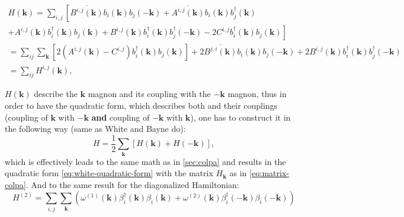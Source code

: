 \documentclass[a4paper,12pt]{article}
\begin{document}
            \begin{multline}
                H(\boldsymbol{k}) = \sum_{i,j}\left[\overline{B^{i,j}(\boldsymbol{k})}b_{i}(\boldsymbol{k})b_{j}(-\boldsymbol{k}) +
                \overline{A^{i,j}(\boldsymbol{k})}b_{i}(\boldsymbol{k})b^{\dag}_{j}(\boldsymbol{k})\right. \\+ 
                A^{i,j}(\boldsymbol{k})b^{\dag}_{i}(\boldsymbol{k})b_{j}(\boldsymbol{k}) +
                B^{i,j}(\boldsymbol{k})b^{\dag}_{i}(\boldsymbol{k})b^{\dag}_{j}(-\boldsymbol{k})-
                \left.2 C^{i,j}b^{\dag}_{i}(\boldsymbol{k})b_{j}(\boldsymbol{k})\right] \\
                = \sum_{ij}\sum_{\boldsymbol{k}}\left[2(A^{i,j}(\boldsymbol{k}) - C^{i,j})b^{\dag}_{i}(\boldsymbol{k})b_{j}(\boldsymbol{k})\right] 
                +2\overline{B^{j,i}(\boldsymbol{k})}b_i(\boldsymbol{k})b_{j}(-\boldsymbol{k}) 
                +2B^{i,j}(\boldsymbol{k})b^{\dag}_{i}(\boldsymbol{k})b^{\dag}_{j}(-\boldsymbol{k})\\
                = \sum_{ij} H^{i,j}(\boldsymbol{k}),
            \end{multline}

            $H(\boldsymbol{k})$ describe the $\boldsymbol{k}$ magnon and its coupling with the $-\boldsymbol{k}$ magnon, 
            thus in order to have the quadratic form, which describes both and their couplings 
            (coupling of $\boldsymbol{k}$ with $-\boldsymbol{k}$ \textbf{and} coupling of $-\boldsymbol{k}$ with $\boldsymbol{k}$), 
            one has to construct it in the following way (same as White and Bayne do):
            \begin{equation}
                H = \dfrac{1}{2}\sum_{\boldsymbol{k}} \left[H(\boldsymbol{k}) + H(-\boldsymbol{k})\right],
            \end{equation}
            which is effectively leads to the same math as in \ref{sec:colpa} and results in the quadratic form \eqref{eq:white-quadratic-form} 
            with the matrix $H_{\boldsymbol{k}}$ as in \eqref{eq:matrix-colpa}. And to the same result for the diagonalized Hamiltonian:
            \begin{equation}
                H^{(2)} = \sum_{i,j}\sum_{\boldsymbol{k}}\left(\omega^{(1)}(\boldsymbol{k})\beta^{\dag}_i(\boldsymbol{k})\beta_i(\boldsymbol{k}) + 
                \omega^{(2)}(\boldsymbol{k})\beta^{\dag}_i(-\boldsymbol{k})\beta_i(-\boldsymbol{k})\right)
            \end{equation}
\end{document}
